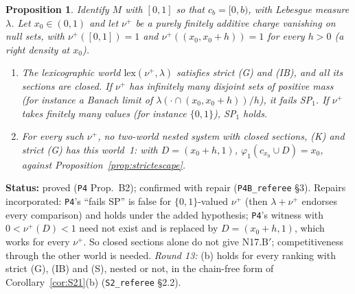\documentclass[11pt]{article}
\newtheorem{proposition}[theorem]{Proposition}
\theoremstyle{definition}
\theoremstyle{remark}
\newcommand{\src}[1]{\texttt{#1}}
\newcommand{\status}[1]{\par\smallskip\noindent\textbf{Status:} #1\par\smallskip}
\begin{document}
\begin{proposition}\label{prop:B2}
Identify $M$ with $[0,1]$ so that $c_b=[0,b)$, with Lebesgue measure $\lambda$. Let $x_0\in(0,1)$ and let $\nu^+$ be a purely finitely additive charge vanishing on null sets, with $\nu^+([0,1])=1$ and $\nu^+((x_0,x_0+h))=1$ for every $h>0$ (a right density at $x_0$).
\begin{enumerate}[leftmargin=*,label=(\alph*)]
\item The lexicographic world $\mathrm{lex}(\nu^+,\lambda)$ satisfies strict (G) and (IB), and all its sections are closed. If $\nu^+$ has infinitely many disjoint sets of positive mass (for instance a Banach limit of $\lambda(\cdot\cap(x_0,x_0+h))/h$), it fails SP$_1$. If $\nu^+$ takes finitely many values (for instance $\{0,1\}$), SP$_1$ holds.
\item For every such $\nu^+$, no two-world nested system with closed sections, (K) and strict (G) has this world~1: with $D=(x_0+h,1)$, $\varphi_1(c_{x_0}\cup D)=x_0$, against Proposition~\ref{prop:strictescape}.
\end{enumerate}
\end{proposition}
\status{proved (\src{P4} Prop.~B2); confirmed with repair (\src{P4B\_referee} \S3). Repairs incorporated: \src{P4}'s ``fails SP'' is false for $\{0,1\}$-valued $\nu^+$ (then $\lambda+\nu^+$ endorses every comparison) and holds under the added hypothesis; \src{P4}'s witness with $0<\nu^+(D)<1$ need not exist and is replaced by $D=(x_0+h,1)$, which works for every $\nu^+$. So closed sections alone do not give N17.B$'$; competitiveness through the other world is needed. \emph{Round 13:} (b) holds for every ranking with strict (G), (IB) and (S), nested or not, in the chain-free form of Corollary~\ref{cor:S21}(b) (\src{S2\_referee} \S2.2).}
\end{document}
